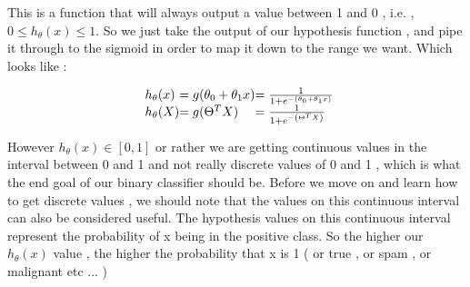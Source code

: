 

This is a function that will always output a value between 1 and 0 , i.e. , $ 0
\leq h_{\theta} (x) \leq 1 $. So we just take the output of our hypothesis
function , and pipe it through to the sigmoid in order to map it down to the
range we want. Which looks like :

\[
\begin{array}{ l@{} l@{} l@{} }
	h_\theta(x)
	& = g(\theta_0 + \theta_1 x) 
	& =
	\frac{1}
	{
		1+e^
		{
			-
			\left(
				\theta_0 + \theta_1 x
			\right)
		}
	}
	\\
	h_\theta(X)
	& = g(\Theta^T X)
	& =
	\frac{1}
	{
		1+e^
		{
			-
			\left(
				\Theta^T X
			\right)
		}
	}
	\\
\end{array}
\]

However $h_\theta(x) \in [0,1]$ or rather we are getting continuous values in
the interval between 0 and 1 and not really discrete values of 0 and 1 , which
is what the end goal of our binary classifier should be. Before we move on and
learn how to get discrete values , we should note that the values on this
continuous interval can also be considered useful. The hypothesis values on
this continuous interval represent the probability of x being in the positive
class. So the higher our $ h_\theta (x)$ value , the higher the probability
that x is 1 ( or true , or spam , or malignant etc ... )

